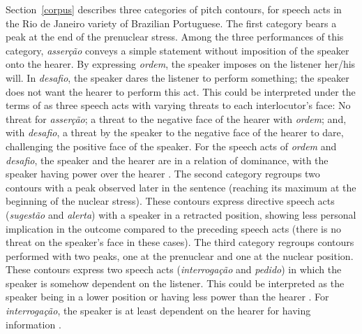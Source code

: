 \documentclass[output=paper]{LSP/langsci}
\begin{document}
Section~\ref{corpus} describes three categories of pitch contours, for speech acts in the Rio de Janeiro variety of Brazilian Portuguese.  
The first category bears a peak at the end of the prenuclear stress. 
Among the three performances of this category, \textit{asserção} conveys a simple statement without imposition of the speaker onto the hearer. 
By expressing \textit{ordem}, the speaker imposes on the listener her/his will. 
In \textit{desafio}, the speaker dares the listener to perform something; the speaker does not want the hearer to perform this act. 
This could be interpreted under the terms of \citet{Brown1987} as three speech acts with varying threats to each interlocutor's face: No threat for \textit{asserção}; a threat to the negative face of the hearer with \textit{ordem}; and, with \textit{desafio}, a threat by the speaker to the negative face of the hearer to dare, challenging the positive face of the speaker. 
For the speech acts of \textit{ordem} and \textit{desafio}, the speaker and the hearer are in a relation of dominance, with the speaker having power over the hearer \citep{spenceroatey1996power}. 
The second category regroups two contours with a peak observed later in the sentence (reaching its maximum at the beginning of the nuclear stress). 
These contours express directive speech acts (\textit{sugestão} and \textit{alerta}) with a speaker in a retracted position, showing less personal implication in the outcome compared to the preceding speech acts (there is no threat on the speaker’s face in these cases). 
The third category regroups contours performed with two peaks, one at the prenuclear and one at the nuclear position. 
These contours express two speech acts (\textit{interrogação} and \textit{pedido}) in which the speaker is somehow dependent on the listener. 
This could be interpreted as the speaker being in a lower position or having less power than the hearer \citep{spenceroatey1996power}. 
For \textit{interrogação}, the speaker is at least dependent on the hearer for having information \citep[see the interpretation of a ``desire for the goodwill of the receiver'' given in ][343]{ohala1994symbolism}.\largerpage
\end{document}
